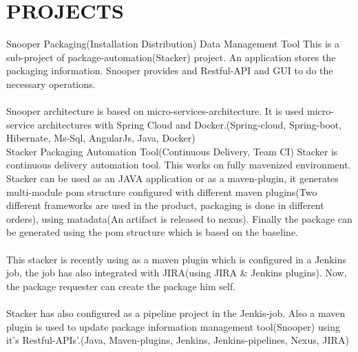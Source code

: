 \documentclass[]{cv-class}
\begin{document}
\section{PROJECTS}
\begin{entrylist}
\entry
    {}
	{Snooper}    
    {Packaging(Installation Distribution) Data Management Tool}
{This is a sub-project of package-automation(Stacker) project. An application stores the packaging information. Snooper provides and Restful-API and GUI to do the necessary operations.\\ \\Snooper architecture is based on micro-services-architecture. It is used micro-service architectures with Spring Cloud and Docker.(Spring-cloud, Spring-boot, Hibernate, Ms-Sql, AngularJs, Java, Docker)}
\\
\entry
    {}
	{Stacker}    
    {Packaging Automation Tool(Continuous Delivery, Team CI)}
    {Stacker is continuous delivery automation tool. This works on fully mavenized environment. Stacker can be used as an JAVA application or as a maven-plugin, it generates multi-module pom structure configured with different maven plugins(Two 			different frameworks are used in the product, packaging is done in different orders), using matadata(An artifact is released to nexus). Finally the package can be generated using the pom structure which is based on the baseline. \\ \\This stacker is recently using as a maven plugin which is configured in a Jenkins job, the job has also integrated with JIRA(using JIRA \& Jenkins plugins). Now, the package requester can create the package him self. \\ \\Stacker has also configured as a pipeline project in the Jenkis-job. Also a maven plugin is used to update package information management tool(Snooper) using it's Restful-APIs'.(Java, Maven-plugins, Jenkins, Jenkins-pipelines, Nexus, JIRA)}
\end{entrylist}


\newpage
\begin{aside}
\end{aside}
\end{document}

